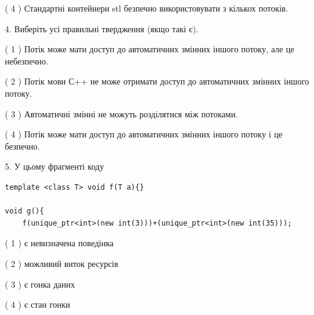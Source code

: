 \documentclass[12pt, ukrainian]{article}
\begin{document}
\begin {large}
{( 4 ) Стандартні контейнери stl безпечно використовувати з кількох потоків.%


4. Виберіть усі правильні твердження (якщо такі є).\par
\vspace{2mm}

( 1 ) Потік може мати доступ до автоматичних змінних іншого потоку, але це небезпечно.%

( 2 ) Потік мови С++ не може отримати доступ до автоматичних змінних іншого потоку.%

( 3 ) Автоматичні змінні не можуть розділятися між потоками.%

( 4 ) Потік може мати доступ до автоматичних змінних іншого потоку і це безпечно.%


5. У цьому фрагменті коду
\begin{verbatim}
template <class T> void f(T a){}

void g(){
    f(unique_ptr<int>(new int(3)))+(unique_ptr<int>(new int(35)));
\end{verbatim}

( 1 ) є невизначена поведінка%

( 2 ) можливий виток ресурсів%

( 3 ) є гонка даних%

( 4 ) є стан гонки%
}
\end {large}
\end{document}
